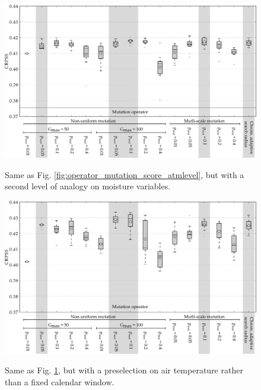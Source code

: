 \documentclass{ametsoc}
\begin{document}
\begin{figure}[t]
	\begin{center}
		\noindent\includegraphics[width=33pc,angle=0]{fig12.pdf}\\
	\end{center}
	\caption{Same as Fig. \ref{fig:operator_mutation_score_atmlevel}, but with a second level of analogy on moisture variables.}
	\label{fig:operator_mutation_score_r2}
\end{figure}

\begin{figure}[t]
	\begin{center}
		\noindent\includegraphics[width=33pc,angle=0]{fig13.pdf}\\
	\end{center}
	\caption{Same as Fig. \ref{fig:operator_mutation_score_r2}, but with a preselection on air temperature rather than a fixed calendar window.}
	\label{fig:operator_mutation_score_r4}
\end{figure}
\end{document}
